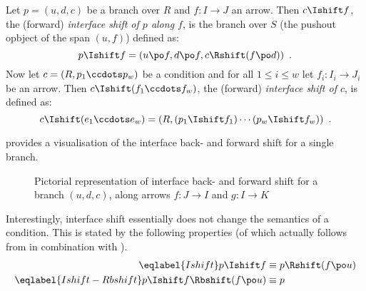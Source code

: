 \begin{definition}
    Let $p=(u,d,c)$ be a branch over $R$ and $f: I\to J$ an arrow. Then $c\Ishift f$, the (forward) \emph{interface shift of $p$ along $f$}, is the branch over $S$ (the pushout opbject of the span $(u,f)$) defined as:
     \[ p \Ishift f = (u\po f,d\po f,c\Rshift (f\po d)) \enspace. \]
    Now let $c=(R,p_1\ccdots p_w)$ be a condition and for all $1\leq i\leq w$ let $f_i:I_i\to J_i$ be an arrow. Then $c\Ishift (f_1\ccdots f_w)$, the (forward) \emph{interface shift of $c$}, is defined as:
	\[ c \Ishift (e_1\ccdots e_w) = (R,(p_1\Ishift f_1)\cdots (p_w\Ishift f_w)) \enspace. \]
\end{definition}
%
 provides a visualisation of the interface back- and forward shift for a single branch.

\begin{figure}
\centering

\caption{Pictorial representation of interface back- and forward shift for a branch $(u,d,c)$, along arrows $f:J\to I$ and $g:I\to K$}
\end{figure}
%
Interestingly, interface shift essentially does not change the semantics of a condition. This is stated by the following properties (of which  actually follows from  in combination with ).
%
\begin{align}
\eqlabel{Ishift}
p\Ishift f & \equiv p\Rshift (f\po u) \\
\eqlabel{Ishift-Rbshift}
p\Ishift f \Rbshift (f\po u) & \equiv p
\end{align}

